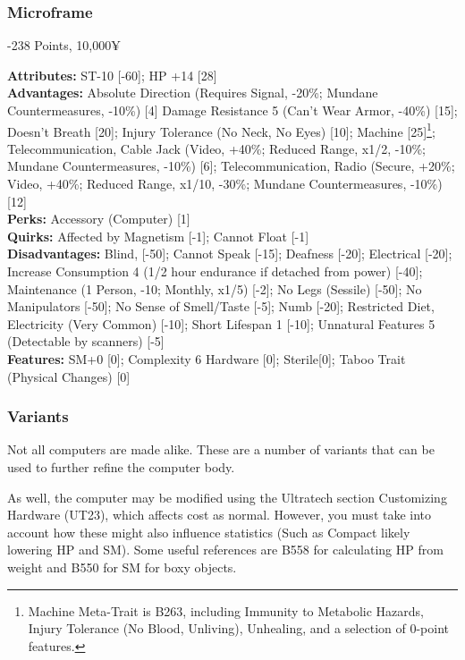\begin{multicols*}{3}
	\subsubsection*{Microframe}\label{ai_computer}
	\begin{flushright}
		-238 Points, 10,000¥
	\end{flushright}
	\textbf{Attributes:} 
	ST-10 [-60]; HP +14 [28]
	\\\textbf{Advantages:} 
	Absolute Direction (Requires Signal, -20\%; Mundane Countermeasures, -10\%) [4] Damage Resistance 5 (Can't Wear Armor, -40\%) [15]; Doesn't Breath [20]; Injury Tolerance (No Neck, No Eyes) [10]; Machine [25]\footnote{Machine Meta-Trait is B263, including Immunity to Metabolic Hazards, Injury Tolerance (No Blood, Unliving), Unhealing, and a selection of 0-point features.}; Telecommunication, Cable Jack (Video, +40\%; Reduced Range, x1/2, -10\%; Mundane Countermeasures, -10\%) [6]; Telecommunication, Radio (Secure, +20\%; Video, +40\%; Reduced Range, x1/10, -30\%; Mundane Countermeasures, -10\%) [12]
	\\\textbf{Perks:}
	Accessory (Computer) [1]
	\\\textbf{Quirks:}
	Affected by Magnetism [-1]; Cannot Float [-1]
	\\\textbf{Disadvantages:} 
	Blind, [-50]; Cannot Speak [-15]; Deafness [-20]; Electrical [-20]; Increase Consumption 4 (1/2 hour endurance if detached from power) [-40]; Maintenance (1 Person, -10; Monthly, x1/5) [-2]; No Legs (Sessile) [-50]; No Manipulators [-50]; No Sense of Smell/Taste [-5]; Numb [-20]; Restricted Diet, Electricity (Very Common) [-10]; Short Lifespan 1 [-10]; Unnatural Features 5 (Detectable by scanners) [-5]
	\\\textbf{Features:}
	SM+0 [0]; Complexity 6 Hardware [0]; Sterile[0]; Taboo Trait (Physical Changes) [0]
	
	\subsubsection*{Variants}
	
	Not all computers are made alike. These are a number of variants that can be used to further refine the computer body. 
	
	As well, the computer may be modified using the \GURPS Ultratech section Customizing Hardware (UT23), which affects cost as normal. However, you must take into account how these might also influence statistics (Such as Compact likely lowering HP and SM). Some useful references are B558 for calculating HP from weight and B550 for SM for boxy objects.
	

\end{multicols*}
